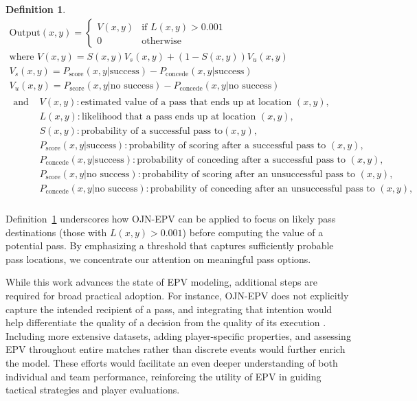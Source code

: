 \newtheorem{definition}{Definition}
\small
\begin{definition}\label{def:output}
\begin{gather*}
\mathrm{Output}(x, y) = \begin{cases} V(x, y) & \text{if } L(x, y) > 0.001 \\ 0 & \text{otherwise} \end{cases} \\
\text{where } V(x, y) = S(x, y) V_{s}(x, y) + (1 - S(x, y)) V_{u}(x, y) \\
V_s(x, y) = P_{\text{score}}(x, y | \text{success}) - P_{\text{concede}}(x, y | \text{success}) \\
V_u(x, y) = P_{\text{score}}(x, y | \text{no success}) - P_{\text{concede}}(x, y | \text{no success}) \\
\begin{aligned}
\text{and } & V(x,y) : \text{estimated value of a pass that ends up at location } (x, y),\\
& L(x, y) : \text{likelihood that a pass ends up at location } (x, y), \\
& S(x, y) : \text{probability of a successful pass to} (x, y), \\
& P_{\text{score}}(x, y | \text{success}) : \text{probability of scoring after a successful pass to } (x, y), \\
& P_{\text{concede}}(x, y | \text{success}) : \text{probability of conceding after a successful pass to } (x, y), \\
& P_{\text{score}}(x, y | \text{no success}) : \text{probability of scoring after an unsuccessful pass to } (x, y), \\
& P_{\text{concede}}(x, y | \text{no success}) : \text{probability of conceding after an unsuccessful pass to } (x, y), \\
\end{aligned}
\end{gather*}
\end{definition}

Definition~\ref{def:output} underscores how OJN-EPV can be applied to focus on likely pass destinations (those with $L(x, y) > 0.001$) before computing the value of a potential pass. By emphasizing a threshold that captures sufficiently probable pass locations, we concentrate our attention on meaningful pass options. 

While this work advances the state of EPV modeling, additional steps are required for broad practical adoption. For instance, OJN-EPV does not explicitly capture the intended recipient of a pass, and integrating that intention would help differentiate the quality of a decision from the quality of its execution \citep{Power2017, peralta2020seeing, dick2022can, spearman2017physics}. Including more extensive datasets, adding player-specific properties, and assessing EPV throughout entire matches rather than discrete events would further enrich the model. These efforts would facilitate an even deeper understanding of both individual and team performance, reinforcing the utility of EPV in guiding tactical strategies and player evaluations.

